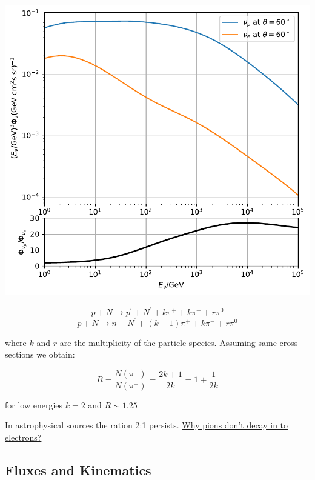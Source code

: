 \documentclass[
  letterpaper,
  DIV=11,
  numbers=noendperiod]{scrreprt}
\begin{document}
\includegraphics{chap3_files/figure-pdf/cell-4-output-2.pdf}

\[ p + N \rightarrow p^\prime + N^\prime  + k \pi^+ + k \pi^- + r\pi^0 \]
\[ p + N \rightarrow n + N^\prime  + (k + 1) \pi^+ + k \pi^- + r\pi^0 \]

where \(k\) and \(r\) are the multiplicity of the particle species.
Assuming same cross sections we obtain:

\[ R = \frac{N(\pi^+)}{N(\pi^-)} = \frac{2k+1}{2k} = 1 + \frac{1}{2k} \]

for low energies \(k = 2\) and \(R \sim 1.25\)

\begin{tcolorbox}[enhanced jigsaw, colframe=quarto-callout-note-color-frame, opacitybacktitle=0.6, left=2mm, leftrule=.75mm, opacityback=0, colbacktitle=quarto-callout-note-color!10!white, breakable, bottomrule=.15mm, toprule=.15mm, colback=white, coltitle=black, bottomtitle=1mm, toptitle=1mm, titlerule=0mm, title=\textcolor{quarto-callout-note-color}{\faInfo}\hspace{0.5em}{Note}, arc=.35mm, rightrule=.15mm]

In astrophysical sources the ration 2:1 persists.
\hyperref[Charged_pion_decays]{Why pions don't decay in to electrons?}

\end{tcolorbox}

\subsection*{Fluxes and Kinematics}\label{fluxes-and-kinematics}
\end{document}
